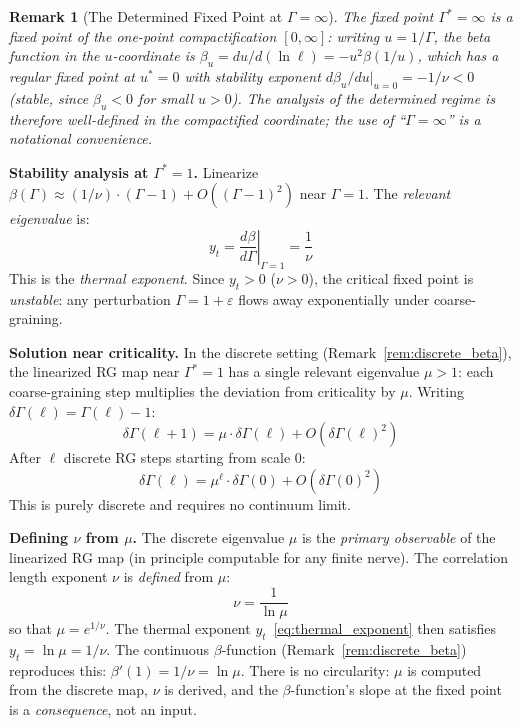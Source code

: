 \documentclass[11pt,letterpaper]{article}
\newtheorem{remark}[conjecture]{Remark}
\begin{document}
\begin{remark}[The Determined Fixed Point at 
$\Gamma = \infty$]\label{rem:compactification}
The fixed point $\Gamma^* = \infty$ is a fixed point of the 
\emph{one-point compactification} $[0, \infty]$: writing 
$u = 1/\Gamma$, the beta function in the $u$-coordinate is 
$\beta_u = du / d(\ln \ell) = -u^2 \beta(1/u)$, which has a 
regular fixed point at $u^* = 0$ with stability exponent 
$d\beta_u/du|_{u=0} = -1/\nu < 0$ (stable, since $\beta_u < 0$ 
for small $u > 0$). The analysis of the determined regime is 
therefore well-defined in the compactified coordinate; the use 
of ``$\Gamma = \infty$'' is a notational convenience.
\end{remark}

\textbf{Stability analysis at $\Gamma^* = 1$.} Linearize 
$\beta(\Gamma) \approx (1/\nu) \cdot (\Gamma - 1) + 
O((\Gamma - 1)^2)$ near $\Gamma = 1$. The \emph{relevant 
eigenvalue} is:
\begin{equation}\label{eq:thermal_exponent}
    y_t = \left.\frac{d\beta}{d\Gamma}\right|_{\Gamma = 1} 
    = \frac{1}{\nu}
\end{equation}
This is the \emph{thermal exponent}. Since $y_t > 0$ ($\nu > 0$), 
the critical fixed point is \emph{unstable}: any perturbation 
$\Gamma = 1 + \varepsilon$ flows away exponentially under 
coarse-graining.

\textbf{Solution near criticality.} In the discrete setting 
(Remark~\ref{rem:discrete_beta}), the linearized RG map near 
$\Gamma^* = 1$ has a single relevant eigenvalue $\mu > 1$: each 
coarse-graining step multiplies the deviation from criticality by 
$\mu$. Writing $\delta\Gamma(\ell) = \Gamma(\ell) - 1$:
\begin{equation}\label{eq:discrete_recursion}
    \delta\Gamma(\ell + 1) = \mu \cdot \delta\Gamma(\ell) 
    + O(\delta\Gamma(\ell)^2)
\end{equation}
After $\ell$ discrete RG steps starting from scale $0$:
\begin{equation}\label{eq:flow_near_crit}
    \delta\Gamma(\ell) = \mu^\ell \cdot \delta\Gamma(0) 
    + O(\delta\Gamma(0)^2)
\end{equation}
This is purely discrete and requires no continuum limit.

\textbf{Defining $\nu$ from $\mu$.} The discrete eigenvalue $\mu$ is 
the \emph{primary observable} of the linearized RG map (in principle 
computable for any finite nerve). The correlation length exponent 
$\nu$ is \emph{defined} from $\mu$:
\begin{equation}\label{eq:nu_from_mu}
    \nu = \frac{1}{\ln \mu}
\end{equation}
so that $\mu = e^{1/\nu}$. The thermal exponent 
$y_t$~\eqref{eq:thermal_exponent} then satisfies $y_t = \ln \mu = 
1/\nu$. The continuous $\beta$-function (Remark~\ref{rem:discrete_beta}) 
reproduces this: $\beta'(1) = 1/\nu = \ln \mu$. There is no 
circularity: $\mu$ is computed from the discrete map, $\nu$ is derived, 
and the $\beta$-function's slope at the fixed point is a 
\emph{consequence}, not an input.
\end{document}
